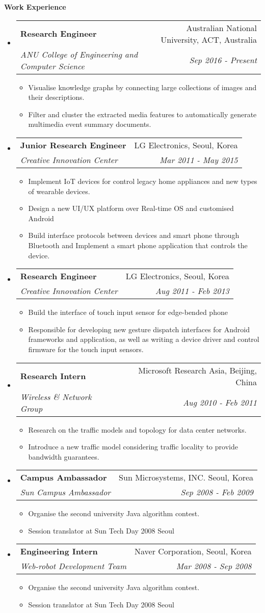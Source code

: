 \documentclass[letterpaper,11pt]{article}
\makeatletter
\newcommand{\resitem}[1]{\item #1 \vspace{-2pt}}
\newcommand{\resheading}[1]{{\large \colorbox{mygrey}{\begin{minipage}{\textwidth}{\textbf{#1 \vphantom{p\^{E}}}}\end{minipage}}}}
\newcommand{\ressubheading}[4]{
\begin{tabular*}{7.0in}{l@{\extracolsep{\fill}}r}
		\textbf{#1} & #2 \\
		\textit{#3} & \textit{#4} \\
\end{tabular*}\vspace{-6pt}}
\makeatother
\begin{document}
\resheading{Work Experience}
\begin{itemize}
\item
	\ressubheading{Research Engineer}{Australian National University, ACT, Australia}{ANU College of Engineering and Computer Science}{Sep 2016 - Present}
	\begin{itemize}
		\resitem{Visualise knowledge graphs by connecting large collections of images and their descriptions.}
		\resitem{Filter and cluster the extracted media features to automatically generate multimedia event summary documents.}
	\end{itemize}
	
\item
	\ressubheading{Junior Research Engineer}{LG Electronics, Seoul, Korea}{Creative Innovation Center}{Mar 2011 - May 2015}
	\begin{itemize}
		\resitem{Implement IoT devices for control legacy home appliances and new types of wearable devices.}
		\resitem{Design a new UI/UX platform over Real-time OS and customised Android}
		\resitem{Build interface protocols between devices and smart phone through Bluetooth and Implement a smart phone application that controls the device.}
	\end{itemize}
\item
	\ressubheading{Research Engineer}{LG Electronics, Seoul, Korea}{Creative Innovation Center}{Aug 2011 - Feb 2013}
	\begin{itemize}
		\resitem{Build the interface of touch input sensor for edge-bended phone}
		\resitem{Responsible for developing new gesture dispatch interfaces for Android frameworks and application, as well as writing a device driver and control firmware for the touch input sensors.}
	\end{itemize}

\item
	\ressubheading{Research Intern}{Microsoft Research Asia, Beijing, China}{Wireless \& Network Group}{Aug 2010 - Feb 2011}
	\begin{itemize}
		\resitem{Research on the traffic models and topology for data center networks.}
        \resitem{Introduce a new traffic model considering traffic locality to provide bandwidth guarantees.}
	\end{itemize}

\item
	\ressubheading{Campus Ambassador}{Sun Microsystems, INC. Seoul, Korea}{Sun Campus Ambassador}{Sep 2008 - Feb 2009}
	\begin{itemize}
		\resitem{Organise the second university Java algorithm contest.}
        \resitem{Session translator at Sun Tech Day 2008 Seoul}
	\end{itemize}

\item
	\ressubheading{Engineering Intern}{Naver Corporation, Seoul, Korea}{Web-robot Development Team}{Mar 2008 - Sep 2008}
	\begin{itemize}
		\resitem{Organise the second university Java algorithm contest.}
        \resitem{Session translator at Sun Tech Day 2008 Seoul}
	\end{itemize}

\end{itemize}
\end{document}
